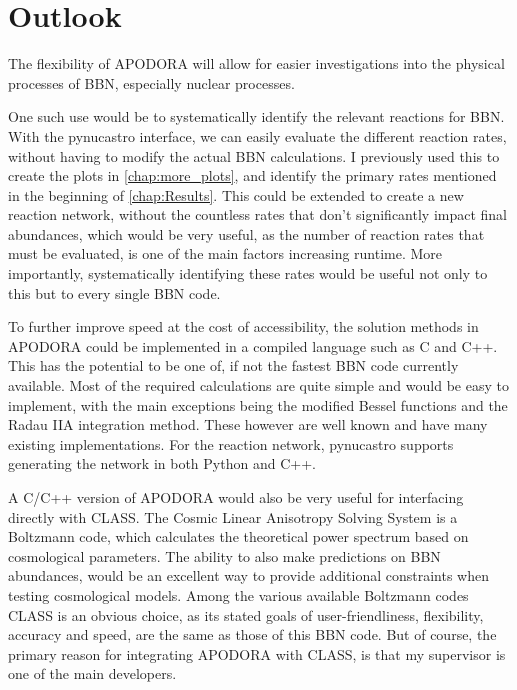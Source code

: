 \section{Outlook}

The flexibility of APODORA will allow for easier investigations into the physical processes of BBN, especially nuclear processes. 

One such use would be to systematically identify the relevant reactions for BBN. With the pynucastro interface, we can easily evaluate the different reaction rates, without having to modify the actual BBN calculations. I previously used this to create the plots in \cref{chap:more_plots}, and identify the primary rates mentioned in the beginning of \cref{chap:Results}. This could be extended to create a new reaction network, without the countless rates that don't significantly impact final abundances, which would be very useful, as the number of reaction rates that must be evaluated, is one of the main factors increasing runtime. More importantly, systematically identifying these rates would be useful not only to this but to every single BBN code. 

To further improve speed at the cost of accessibility, the solution methods in APODORA could be implemented in a compiled language such as C and C++. This has the potential to be one of, if not the fastest BBN code currently available. Most of the required calculations are quite simple and would be easy to implement, with the main exceptions being the modified Bessel functions and the Radau IIA integration method. These however are well known and have many existing implementations\cite{C_Bessel}. For the reaction network, pynucastro supports generating the network in both Python and C++. 

A C/C++ version of APODORA would also be very useful for interfacing directly with CLASS\cite{CLASS_Diego_Blas_2011}. The Cosmic Linear Anisotropy Solving System is a Boltzmann code, which calculates the theoretical power spectrum based on cosmological parameters. The ability to also make predictions on BBN abundances, would be an excellent way to provide additional constraints when testing cosmological models. Among the various available Boltzmann codes CLASS is an obvious choice, as its stated goals of user-friendliness, flexibility, accuracy and speed\cite{CLASS_Diego_Blas_2011}, are the same as those of this BBN code. But of course, the primary reason for integrating APODORA with CLASS, is that my supervisor is one of the main developers. 

